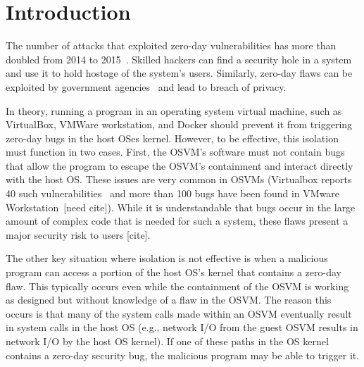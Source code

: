 \section{Introduction}
\label{sec.introduction}

%
The number of attacks that exploited zero-day vulnerabilities has more than 
doubled from 2014 to 2015~\cite{zero-day}. Skilled hackers can find a security 
hole in a system and use it to hold hostage of the system's users. Similarly, zero-day 
flaws can be exploited by government agencies~\cite{fbi-ff, fbi-iphone} and
lead to breach of privacy. 
%


In theory, running a program in an operating system virtual machine, such as 
VirtualBox, VMWare workstation, and Docker should prevent it from triggering 
zero-day bugs in the host OSes kernel.  However, to be 
effective, this isolation must function in two cases.  First, the OSVM's 
software must not contain bugs that allow the program to escape the 
OSVM's containment and interact directly with the host OS.  These
issues are very common in OSVMs (Virtualbox reports 40 such 
vulnerabilities~\cite{Virtualbox-Vulnerabilities} and more than 100 bugs have 
been found in VMware Workstation~[need cite]).  While it is understandable that
bugs occur in the large amount of complex code that is needed for such a 
system, these flaws present a major security risk to users [cite].


The other key situation where isolation is not effective is when a malicious 
program  can access a portion of the host OS's kernel that contains a 
zero-day flaw.  This typically occurs even while the containment of the OSVM is 
working as designed but without knowledge of a flaw in the OSVM.  The reason
this occurs is that many of the system calls made within an OSVM eventually 
result in system calls in the host OS (e.g., network I/O from the guest
OSVM results in network I/O by the host OS kernel).  If one of these paths in
the OS kernel contains a zero-day security bug, the malicious program
may be able to trigger it.

